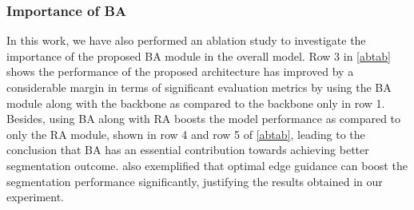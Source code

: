 \documentclass[review]{elsarticle}
\begin{document}
\begin{table*}[]
\centering
\caption{Results of the ablation study considering various components of the MFSNet model on the  dataset. Best results are highlighted.}
\label{abtab}
\end{table*}

\subsubsection{Importance of BA}
In this work, we have also performed an ablation study to investigate the importance of the proposed BA module in the overall model. Row 3 in \autoref{abtab} shows the performance of the proposed architecture has improved by a considerable margin in terms of significant evaluation metrics by using the BA module along with the  backbone as compared to the backbone only in row 1. Besides, using BA along with RA boosts the model performance as compared to only the RA module, shown in row 4 and row 5 of \autoref{abtab}, leading to the conclusion that BA has an essential contribution towards achieving better segmentation outcome. \cite{zhang2019net} also exemplified that optimal edge guidance can boost the segmentation performance significantly, justifying the results obtained in our experiment.
\end{document}
